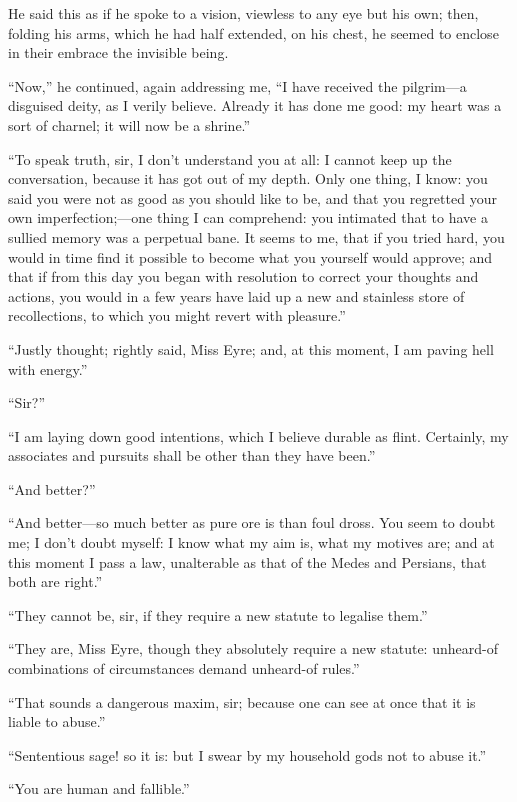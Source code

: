He said this as if he spoke to a vision, viewless to any eye but his
own; then, folding his arms, which he had half extended, on his chest,
he seemed to enclose in their embrace the invisible being.

\enquote{Now,} he continued, again addressing me, \enquote{I have
	received the pilgrim---a disguised deity, as I verily believe. Already
	it has done me good: my heart was a sort of charnel; it will now be a
	shrine.}

\enquote{To speak truth, sir, I don't understand you at all: I cannot
	keep up the conversation, because it has got out of my depth. Only one
	thing, I know: you said you were not as good as you should like to be,
	and that you regretted your own imperfection;---one thing I can
	comprehend: you intimated that to have a sullied memory was a perpetual
	bane. It seems to me, that if you tried hard, you would in time find it
	possible to become what you yourself would approve; and that if from
	this day you began with resolution to correct your thoughts and actions,
	you would in a few years have laid up a new and stainless store of
	recollections, to which you might revert with pleasure.}

\enquote{Justly thought; rightly said, Miss Eyre; and, at this moment, I
	am paving hell with energy.}

\enquote{Sir?}

\enquote{I am laying down good intentions, which I believe durable as
	flint. Certainly, my associates and pursuits shall be other than they
	have been.}

\enquote{And better?}

\enquote{And better---so much better as pure ore is than foul dross.
	You seem to doubt me; I don't doubt myself: I know what my aim is, what
	my motives are; and at this moment I pass a law, unalterable as that of
	the Medes and Persians, that both are right.}

\enquote{They cannot be, sir, if they require a new statute to legalise
	them.}

\enquote{They are, Miss Eyre, though they absolutely require a new
	statute: unheard-of combinations of circumstances demand unheard-of
	rules.}

\enquote{That sounds a dangerous maxim, sir; because one can see at once
	that it is liable to abuse.}

\enquote{Sententious sage! so it is: but I swear by my household gods
	not to abuse it.}

\enquote{You are human and fallible.}

